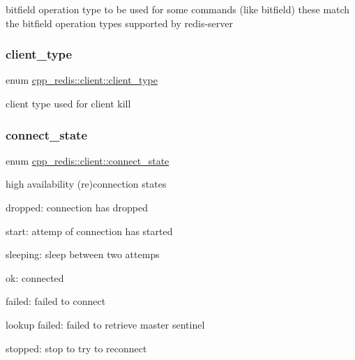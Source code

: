 bitfield operation type to be used for some commands (like bitfield) these match the bitfield operation types supported by redis-\/server \mbox{\label{classcpp__redis_1_1client_a388877b01b4e045cddb138e70a68e000}} 
\subsubsection{\texorpdfstring{client\+\_\+type}{client\_type}}
{\footnotesize\ttfamily enum \hyperlink{classcpp__redis_1_1client_a388877b01b4e045cddb138e70a68e000}{cpp\+\_\+redis\+::client\+::client\+\_\+type}\hspace{0.3cm}{\ttfamily [strong]}}

client type used for client kill \mbox{\label{classcpp__redis_1_1client_a2512bd48dd45391249a69bd720c1e4da}} 
\subsubsection{\texorpdfstring{connect\+\_\+state}{connect\_state}}
{\footnotesize\ttfamily enum \hyperlink{classcpp__redis_1_1client_a2512bd48dd45391249a69bd720c1e4da}{cpp\+\_\+redis\+::client\+::connect\+\_\+state}\hspace{0.3cm}{\ttfamily [strong]}}

high availability (re)connection states
\begin{DoxyItemize}
\item dropped\+: connection has dropped
\item start\+: attemp of connection has started
\item sleeping\+: sleep between two attemps
\item ok\+: connected
\item failed\+: failed to connect
\item lookup failed\+: failed to retrieve master sentinel
\item stopped\+: stop to try to reconnect 
\end{DoxyItemize}\mbox{\label{classcpp__redis_1_1client_aa5998536fd32ff4387c89be514997620}} 
